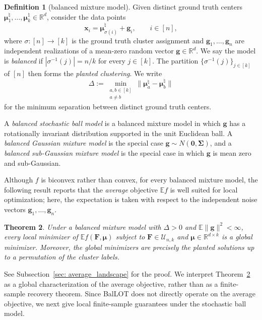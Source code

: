 \documentclass{article}
\theoremstyle{plain}
\newtheorem{theorem}{Theorem}
\theoremstyle{definition}
\newtheorem{definition}[theorem]{Definition}
\newcommand{\1}{\mathbf{1}}
\newcommand{\Rdk}{\mathbb{R}^{d\times k}}
\newcommand{\hmu}{\bm{\mu}^\natural}
\newcommand{\bUnk}{\mathcal{U}_{n,k}}
\newcommand{\bmF}{\bm{F}}
\newcommand{\bmu}{\bm{\mu}}
\begin{document}
\begin{definition}[balanced mixture model]
\label{def.balanced mixture model}
Given distinct ground truth centers $\hmu_1,\ldots,\hmu_k\in\mathbb{R}^d$, consider the data points
\[
\bm{x}_i=\hmu_{\sigma(i)}+\bm{g}_i,
\qquad i\in[n],
\]
where $\sigma\colon[n]\to[k]$ is the ground truth cluster assignment and $\bm{g}_1,\ldots,\bm{g}_n$ are independent realizations of a mean-zero random vector $\bm{g}\in\mathbb{R}^d$.
We say the model is \textit{balanced} if $|\sigma^{-1}(j)|=n/k$ for every $j\in[k]$.
The partition $\{ \sigma^{-1}(j)\}_{j\in[k]}$ of $[n]$ then forms the \textit{planted clustering}.
We write
\[
\Delta:=\min_{\substack{a,b\in[k]\\a\neq b}}\|\hmu_a-\hmu_b\|
\]
for the minimum separation between distinct ground truth centers.
\end{definition}

A \textit{balanced stochastic ball model} is a balanced mixture model in which $\bm{g}$ has a rotationally invariant distribution supported in the unit Euclidean ball.
A \textit{balanced Gaussian mixture model} is the special case $\bm{g}\sim N(\bm{0},\bm{\Sigma})$, and a \textit{balanced sub-Gaussian mixture model} is the special case in which $\bm{g}$ is mean zero and sub-Gaussian.

Although $f$ is biconvex rather than convex, for every balanced mixture model, the following result reports that the \textit{average} objective $\mathbb{E}f$ is well suited for local optimization; here, the expectation is taken with respect to the independent noise vectors $\bm{g}_1,\ldots,\bm{g}_n$.

\begin{theorem}
\label{thm: informal_average_landscape}
Under a balanced mixture model with $\Delta>0$ and $\mathbb{E}\|\bm{g}\|^2<\infty$, every local minimizer of $\mathbb{E}f(\bmF,\bmu)$ subject to $\bmF\in\bUnk$ and $\bmu\in\Rdk$ is a global minimizer.
Moreover, the global minimizers are precisely the planted solutions up to a permutation of the cluster labels.
\end{theorem}

See Subsection~\ref{sec: average_landscape} for the proof.
We interpret Theorem~\ref{thm: informal_average_landscape} as a global characterization of the average objective, rather than as a finite-sample recovery theorem.
Since BalLOT does not directly operate on the average objective, we next give local finite-sample guarantees under the stochastic ball model.
\end{document}
